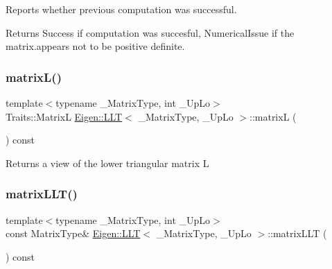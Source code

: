 Reports whether previous computation was successful. 

\begin{DoxyReturn}{Returns}
{\ttfamily Success} if computation was succesful, {\ttfamily Numerical\+Issue} if the matrix.\+appears not to be positive definite. 
\end{DoxyReturn}
\mbox{\label{class_eigen_1_1_l_l_t_a7f4a3eedbf82e7ce2d6bf0dcd84cdfa3}} 
\subsubsection{\texorpdfstring{matrixL()}{matrixL()}}
{\footnotesize\ttfamily template$<$typename \+\_\+\+Matrix\+Type, int \+\_\+\+Up\+Lo$>$ \\
Traits\+::\+MatrixL \mbox{\hyperlink{class_eigen_1_1_l_l_t}{Eigen\+::\+L\+LT}}$<$ \+\_\+\+Matrix\+Type, \+\_\+\+Up\+Lo $>$\+::matrixL (\begin{DoxyParamCaption}{ }\end{DoxyParamCaption}) const\hspace{0.3cm}{\ttfamily [inline]}}

\begin{DoxyReturn}{Returns}
a view of the lower triangular matrix L 
\end{DoxyReturn}
\mbox{\label{class_eigen_1_1_l_l_t_af62881fc95c7e54a93b63c20f2c62b46}} 
\subsubsection{\texorpdfstring{matrixLLT()}{matrixLLT()}}
{\footnotesize\ttfamily template$<$typename \+\_\+\+Matrix\+Type, int \+\_\+\+Up\+Lo$>$ \\
const Matrix\+Type\& \mbox{\hyperlink{class_eigen_1_1_l_l_t}{Eigen\+::\+L\+LT}}$<$ \+\_\+\+Matrix\+Type, \+\_\+\+Up\+Lo $>$\+::matrix\+L\+LT (\begin{DoxyParamCaption}{ }\end{DoxyParamCaption}) const\hspace{0.3cm}{\ttfamily [inline]}}

